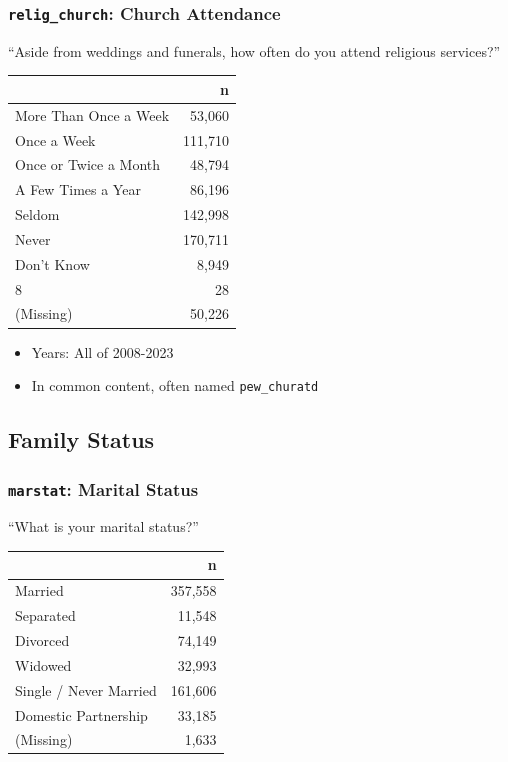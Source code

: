 \documentclass[10pt,article,oneside]{memoir}
\theoremstyle{definition}
\begin{document}
\subsubsection{\texorpdfstring{\texttt{relig\_church}: Church
Attendance}{relig\_church: Church Attendance}}\label{relig_church-church-attendance}

``Aside from weddings and funerals, how often do you attend religious
services?''

\begin{table}[H]
\centering
\begin{tabular}[t]{lr}
\toprule
 & n\\
\midrule
More Than Once a Week & 53,060\\
Once a Week & 111,710\\
Once or Twice a Month & 48,794\\
A Few Times a Year & 86,196\\
Seldom & 142,998\\
Never & 170,711\\
Don't Know & 8,949\\
8 & 28\\
(Missing) & 50,226\\
\bottomrule
\end{tabular}
\end{table}

\begin{itemize}
\tightlist
\item
  Years: All of 2008-2023
\item
  In common content, often named \texttt{pew\_churatd}
\end{itemize}

\subsection{Family Status}\label{family-status}

\subsubsection{\texorpdfstring{\texttt{marstat}: Marital
Status}{marstat: Marital Status}}\label{marstat-marital-status}

``What is your marital status?''

\begin{table}[H]
\centering
\begin{tabular}[t]{lr}
\toprule
 & n\\
\midrule
Married & 357,558\\
Separated & 11,548\\
Divorced & 74,149\\
Widowed & 32,993\\
Single / Never Married & 161,606\\
Domestic Partnership & 33,185\\
(Missing) & 1,633\\
\bottomrule
\end{tabular}
\end{table}
\end{document}
